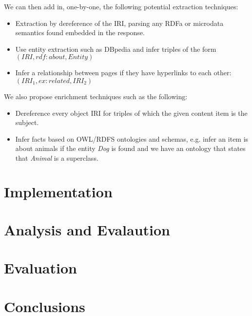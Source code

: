 \documentclass{sig-alternate-05-2015}
\begin{document}
We can then add in, one-by-one, the following potential extraction techniques:

\begin{itemize}
\item Extraction by dereference of the IRI, parsing any RDFa or microdata
semantics found embedded in the response.
\item Use entity extraction such as DBpedia and infer triples of the form
$(IRI, rdf\!\!:\!\!about, Entity)$
\item Infer a relationship between pages if they have hyperlinks to each
other: $(IRI_1, ex:related, IRI_2)$
\end{itemize}

We also propose enrichment techniques such as the following:

\begin{itemize}
\item Dereference every object IRI for triples of which the given content item
is the subject.
\item Infer facts based on OWL/RDFS ontologies and schemas, e.g. infer an
item is about animals if the entity \emph{Dog} is found and we have an
ontology that states that \emph{Animal} is a superclass.
\end{itemize}

\section{Implementation}

\section{Analysis and Evalaution}

\section{Evaluation}

\section{Conclusions}



\end{document}
